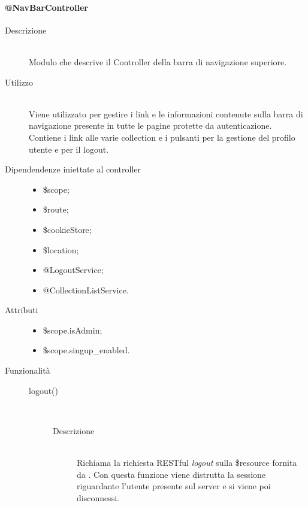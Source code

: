 \paragraph{@NavBarController}
\begin{description}
 \item[Descrizione] \hfill \\
 Modulo che descrive il Controller della barra di navigazione superiore.
 
 \item[Utilizzo] \hfill \\
 Viene utilizzato per gestire i link e le informazioni contenute sulla barra di navigazione presente in tutte le pagine protette da autenticazione.
 Contiene i link alle varie collection e i pulsanti per la gestione del profilo utente e per il logout.
 
 \item[Dipendendenze iniettate al controller] \hfill 
 \begin{itemize}
  \item \$scope;
  \item \$route;
  \item \$cookieStore;
  \item \$location;
  \item @LogoutService;
  \item @CollectionListService.
  
 \end{itemize}
 
 \item[Attributi] \hfill 
 \begin{itemize}
 \item \$scope.isAdmin;
 \item \$scope.singup\_enabled.

 \end{itemize}
 
 \item[Funzionalità] \hfill 
 \begin{description}
   
  	\item[logout()] \hfill \\
  	\begin{description}
  	\item[Descrizione] \hfill \\
  Richiama la richiesta RESTful \textit{logout} sulla \$resource fornita da . Con questa funzione viene distrutta la sessione riguardante l'utente presente sul server e si viene poi disconnessi.
  	\end{description}
   
 \end{description}
\end{description}

